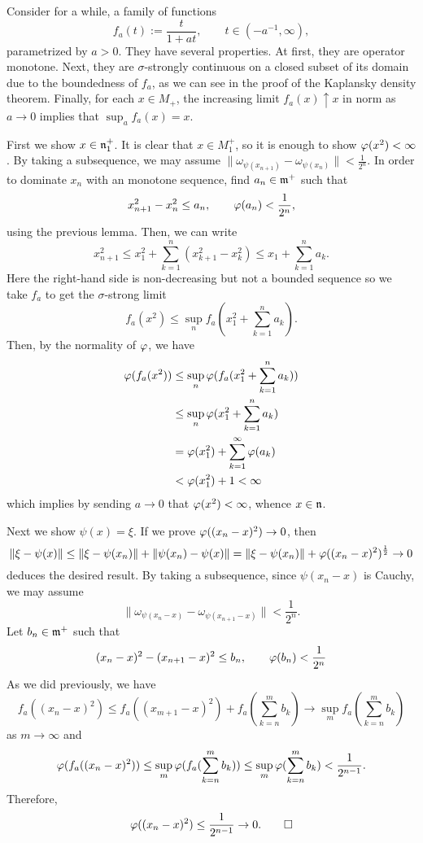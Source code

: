 \documentclass{../../small}
\begin{document}
\begin{pf}
Consider for a while, a family of functions
\[f_a(t):=\frac t{1+at},\qquad t\in(-a^{-1},\infty),\]
parametrized by $a>0$.
They have several properties.
At first, they are operator monotone.
Next, they are $\sigma$-strongly continuous on a closed subset of its domain due to the boundedness of $f_a$, as we can see in the proof of the Kaplansky density theorem.
Finally, for each $x\in M_+$, the increasing limit $f_a(x)\uparrow x$ in norm as $a\to0$ implies that $\sup_af_a(x)=x$.

First we show $x\in\mathfrak{n}^+_1$.
It is clear that $x\in M^+_1$, so it is enough to show $\varphi(x^2)<\infty$.
By taking a subsequence, we may assume $\|\omega_{\psi(x_{n+1})}-\omega_{\psi(x_n)}\|<\frac1{2^n}$.
In order to dominate $x_n$ with an monotone sequence, find $a_n\in\mathfrak{m}^+$ such that
\[x_{n+1}^2-x_n^2\le a_n,\qquad \varphi(a_n)<\frac1{2^n},\]
using the previous lemma.
Then, we can write
\[x_{n+1}^2\le x_1^2+\sum_{k=1}^n(x_{k+1}^2-x_k^2)\le x_1+\sum_{k=1}^na_k.\]
Here the right-hand side is non-decreasing but not a bounded sequence so we take $f_a$ to get the $\sigma$-strong limit
\[f_a(x^2)\le\sup_nf_a(x_1^2+\sum_{k=1}^na_k).\]
Then, by the normality of $\varphi$, we have
\begin{align*}
\varphi(f_a(x^2))
&\le\sup_n\varphi(f_a(x_1^2+\sum_{k=1}^na_k))\\
&\le\sup_n\varphi(x_1^2+\sum_{k=1}^na_k)\\
&=\varphi(x_1^2)+\sum_{k=1}^\infty\varphi(a_k)\\
&<\varphi(x_1^2)+1<\infty
\end{align*}
which implies by sending $a\to0$ that $\varphi(x^2)<\infty$, whence $x\in\mathfrak{n}$.

Next we show $\psi(x)=\xi$.
If we prove $\varphi((x_n-x)^2)\to0$, then
\[\|\xi-\psi(x)\|\le\|\xi-\psi(x_n)\|+\|\psi(x_n)-\psi(x)\|=\|\xi-\psi(x_n)\|+\varphi((x_n-x)^2)^{\frac12}\to0\]
deduces the desired result.
By taking a subsequence, since $\psi(x_n-x)$ is Cauchy, we may assume
\[\|\omega_{\psi(x_n-x)}-\omega_{\psi(x_{n+1}-x)}\|<\frac1{2^n}.\]
Let $b_n\in\mathfrak{m}^+$ such that
\[(x_n-x)^2-(x_{n+1}-x)^2\le b_n,\qquad\varphi(b_n)<\frac1{2^n}\]
As we did previously, we have
\[f_a((x_n-x)^2)\le f_a((x_{m+1}-x)^2)+f_a(\sum_{k=n}^mb_k)\to\sup_mf_a(\sum_{k=n}^mb_k)\]
as $m\to\infty$ and
\[\varphi(f_a((x_n-x)^2))
\le\sup_m\varphi(f_a(\sum_{k=n}^mb_k))
\le\sup_m\varphi(\sum_{k=n}^mb_k)<\frac1{2^{n-1}}.\]
Therefore,
\[\varphi((x_n-x)^2)\le\frac1{2^{n-1}}\to0.\qedhere\]
\end{pf}
\end{document}
